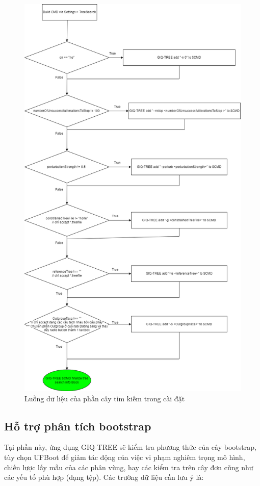 \documentclass[12pt]{report}
\begin{document}
\begin{figure}[h]
	\centering
	\includegraphics[scale=0.4]{Image/4.10.png}
	\caption{Luồng dữ liệu của phần cây tìm kiếm trong cài đặt }
	\label{fig:image4.10}
\end{figure}

\subsection{Hỗ trợ phân tích bootstrap}
Tại phần này, ứng dụng GIQ-TREE sẽ kiểm tra phương thức của cây bootstrap, tùy chọn UFBoot để giảm tác động của việc vi phạm nghiêm trọng mô hình, chiến lược lấy mẫu của các phân vùng, hay các kiểm tra trên cây đơn cũng như các yếu tố phù hợp (dạng tệp). Các trường dữ liệu cần lưu ý là:
\end{document}
